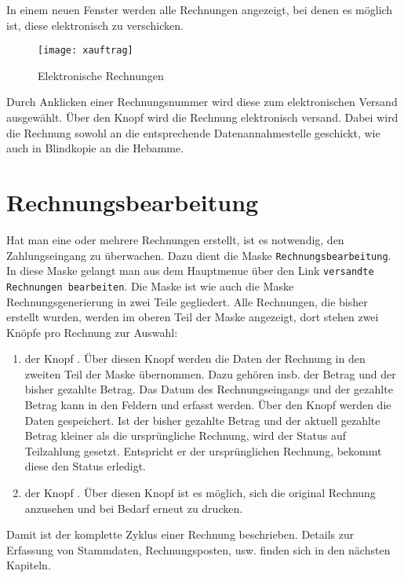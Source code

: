 In einem neuen Fenster werden alle Rechnungen angezeigt, bei denen
es möglich ist, diese elektronisch zu verschicken.

\begin{figure}[ht]
\centering
\texttt{[image: xauftrag]}
\caption{Elektronische Rechnungen \label{kurz:xauftrag:fig}}
\end{figure}
Durch Anklicken einer Rechnungsnummer wird diese zum elektronischen Versand
ausgewählt. Über den Knopf  wird die Rechnung elektronisch
versand. Dabei wird die Rechnung sowohl an die entsprechende 
Datenannahmestelle geschickt, wie auch in Blindkopie an die Hebamme.
%
%
\section{Rechnungsbearbeitung}\label{kurz:rechnungsbearbeitung:kap}
Hat man eine oder mehrere Rechnungen erstellt, ist es notwendig, den
Zahlungseingang zu überwachen. Dazu dient die Maske 
\texttt{Rechnungsbearbeitung}. In diese Maske gelangt man aus dem
Hauptmenue über den Link \verb|versandte Rechnungen bearbeiten|.
Die Maske ist wie
auch die Maske Rechnungsgenerierung in zwei Teile gegliedert. Alle Rechnungen,
die bisher erstellt wurden, werden im oberen Teil der Maske angezeigt, dort
stehen zwei Knöpfe pro Rechnung zur Auswahl: 
% 
\begin{enumerate}[1.]
\item der Knopf .
Über diesen Knopf werden die Daten der Rechnung
in den zweiten Teil der Maske übernommen. Dazu gehören insb. der Betrag
und der bisher gezahlte Betrag. Das Datum des
Rechnungseingangs und der gezahlte Betrag kann in den Feldern 
und  erfasst werden. Über den Knopf 
werden die Daten gespeichert. Ist der bisher gezahlte Betrag und der aktuell
gezahlte Betrag kleiner als die ursprüngliche Rechnung, wird der Status auf
Teilzahlung gesetzt. Entspricht er der ursprünglichen Rechnung, bekommt diese
den Status erledigt.
\item der Knopf .
Über diesen Knopf ist es möglich, sich
die original Rechnung anzusehen und bei Bedarf erneut zu drucken.
\end{enumerate}

Damit ist der komplette Zyklus einer Rechnung beschrieben. 
Details zur Erfassung von Stammdaten, Rechnungsposten, usw. 
finden sich in den nächsten Kapiteln.



